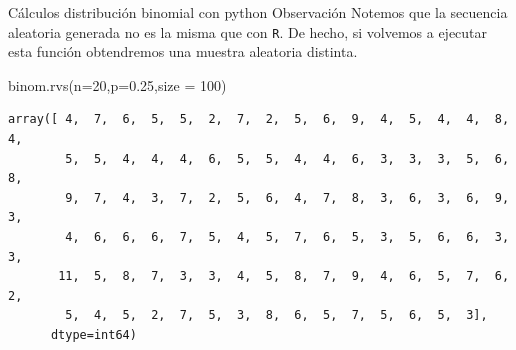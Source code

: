 \documentclass[
  ignorenonframetext,
  aspectratio=169]{beamer}
\newenvironment{Shaded}{\begin{snugshade}}{\end{snugshade}}
\newcommand{\DecValTok}[1]{\textcolor[rgb]{0.68,0.00,0.00}{#1}}
\newcommand{\FloatTok}[1]{\textcolor[rgb]{0.68,0.00,0.00}{#1}}
\newcommand{\NormalTok}[1]{\textcolor[rgb]{0.00,0.23,0.31}{#1}}
\newcommand{\OperatorTok}[1]{\textcolor[rgb]{0.37,0.37,0.37}{#1}}
\begin{document}
\begin{frame}[fragile]{Cálculos distribución binomial con python}
\protect\hypertarget{cuxe1lculos-distribuciuxf3n-binomial-con-python-4}{}
Observación Notemos que la secuencia aleatoria generada no es la misma
que con \texttt{R}. De hecho, si volvemos a ejecutar esta función
obtendremos una muestra aleatoria distinta.

\begin{Shaded}
\begin{Highlighting}[]
\NormalTok{binom.rvs(n}\OperatorTok{=}\DecValTok{20}\NormalTok{,p}\OperatorTok{=}\FloatTok{0.25}\NormalTok{,size }\OperatorTok{=} \DecValTok{100}\NormalTok{)}
\end{Highlighting}
\end{Shaded}

\begin{verbatim}
array([ 4,  7,  6,  5,  5,  2,  7,  2,  5,  6,  9,  4,  5,  4,  4,  8,  4,
        5,  5,  4,  4,  4,  6,  5,  5,  4,  4,  6,  3,  3,  3,  5,  6,  8,
        9,  7,  4,  3,  7,  2,  5,  6,  4,  7,  8,  3,  6,  3,  6,  9,  3,
        4,  6,  6,  6,  7,  5,  4,  5,  7,  6,  5,  3,  5,  6,  6,  3,  3,
       11,  5,  8,  7,  3,  3,  4,  5,  8,  7,  9,  4,  6,  5,  7,  6,  2,
        5,  4,  5,  2,  7,  5,  3,  8,  6,  5,  7,  5,  6,  5,  3],
      dtype=int64)
\end{verbatim}
\end{frame}
\end{document}
